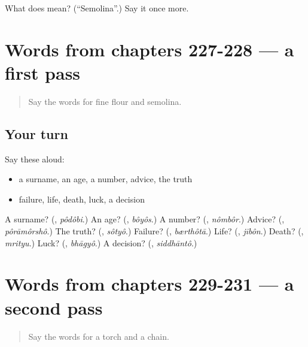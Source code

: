 \begin{tcolorbox}[breakable,colback=teal!4,colframe=teal!35!black,title={Before you move on}]
What does  mean? (\textquotedblleft{}Semolina\textquotedblright{}.) Say it once more.
\end{tcolorbox}
\section[(dialogue)]{Words from chapters 227-228 — a first pass}

\label{lesson:BN-R231-first-pass-words-from-chapters-227-228}



\begin{quote}
Say the words for fine flour and semolina.
\end{quote}

\subsection*{Your turn}
Say these aloud:

\begin{itemize}
\raggedright
  \item a surname, an age, a number, advice, the truth
  \item failure, life, death, luck, a decision
\end{itemize}

\begin{tcolorbox}[breakable,colback=teal!4,colframe=teal!35!black,title={Before you move on}]
A surname? (\textbf{}, \emph{pôdôbi}.) An age? (\textbf{}, \emph{bôyôs}.) A number? (\textbf{}, \emph{nômbôr}.) Advice? (\textbf{}, \emph{pôrāmôrshô}.) The truth? (\textbf{}, \emph{sôtyô}.) Failure? (\textbf{}, \emph{bærthôtā}.) Life? (\textbf{}, \emph{jībôn}.) Death? (\textbf{}, \emph{mrityu}.) Luck? (\textbf{}, \emph{bhāgyô}.) A decision? (\textbf{}, \emph{siddhāntô}.)
\end{tcolorbox}
\section[(dialogue)]{Words from chapters 229-231 — a second pass}

\label{lesson:BN-R231-second-pass-words-from-chapters-229-231}



\begin{quote}
Say the words for a torch and a chain.
\end{quote}


